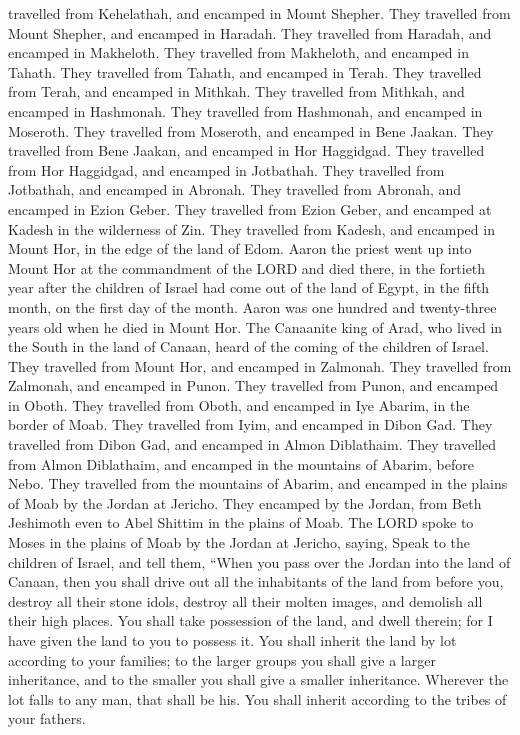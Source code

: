 travelled from Kehelathah, and encamped in Mount Shepher. 
They travelled from Mount Shepher, and encamped in Haradah.
 They travelled from Haradah, and encamped in Makheloth.
 They travelled from Makheloth, and encamped in Tahath.
 They travelled from Tahath, and encamped in Terah.
 They travelled from Terah, and encamped in Mithkah.
 They travelled from Mithkah, and encamped in Hashmonah.
 They travelled from Hashmonah, and encamped in Moseroth.
 They travelled from Moseroth, and encamped in Bene Jaakan.
 They travelled from Bene Jaakan, and encamped in Hor
Haggidgad.  They travelled from Hor Haggidgad, and encamped
in Jotbathah.  They travelled from Jotbathah, and encamped
in Abronah.  They travelled from Abronah, and encamped in
Ezion Geber.  They travelled from Ezion Geber, and encamped
at Kadesh in the wilderness of Zin.  They travelled from
Kadesh, and encamped in Mount Hor, in the edge of the land of Edom.
 Aaron the priest went up into Mount Hor at the commandment
of the LORD and died there, in the fortieth year after the children of
Israel had come out of the land of Egypt, in the fifth month, on the
first day of the month.  Aaron was one hundred and
twenty-three years old when he died in Mount Hor.  The
Canaanite king of Arad, who lived in the South in the land of Canaan,
heard of the coming of the children of Israel.  They
travelled from Mount Hor, and encamped in Zalmonah.  They
travelled from Zalmonah, and encamped in Punon.  They
travelled from Punon, and encamped in Oboth.  They
travelled from Oboth, and encamped in Iye Abarim, in the border of Moab.
 They travelled from Iyim, and encamped in Dibon Gad.
 They travelled from Dibon Gad, and encamped in Almon
Diblathaim.  They travelled from Almon Diblathaim, and
encamped in the mountains of Abarim, before Nebo.  They
travelled from the mountains of Abarim, and encamped in the plains of
Moab by the Jordan at Jericho.  They encamped by the
Jordan, from Beth Jeshimoth even to Abel Shittim in the plains of Moab.
 The LORD spoke to Moses in the plains of Moab by the
Jordan at Jericho, saying,  Speak to the children of
Israel, and tell them, ``When you pass over the Jordan into the land of
Canaan,  then you shall drive out all the inhabitants of
the land from before you, destroy all their stone idols, destroy all
their molten images, and demolish all their high places. 
You shall take possession of the land, and dwell therein; for I have
given the land to you to possess it.  You shall inherit the
land by lot according to your families; to the larger groups you shall
give a larger inheritance, and to the smaller you shall give a smaller
inheritance. Wherever the lot falls to any man, that shall be his. You
shall inherit according to the tribes of your fathers.


